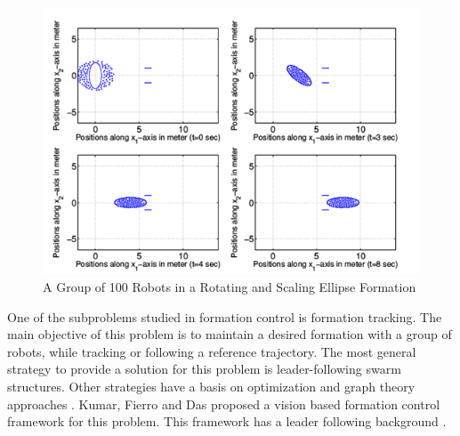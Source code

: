\begin{figure}[H]
	\caption{A Group of 100 Robots in a Rotating and Scaling Ellipse Formation \cite{8}}
	\centering
	\includegraphics[scale = 1]{slotine}
\end{figure} 

One of the subproblems studied in formation control is formation tracking. The main objective of this problem is to maintain a desired formation with a group of robots, while tracking or following a reference trajectory. The most general strategy to provide a solution for this problem is leader-following swarm structures. Other strategies have a basis on optimization and graph theory approaches \cite{12}. Kumar, Fierro and Das proposed a vision based formation control framework  for this problem. This framework has a leader following background \cite{18}. 

